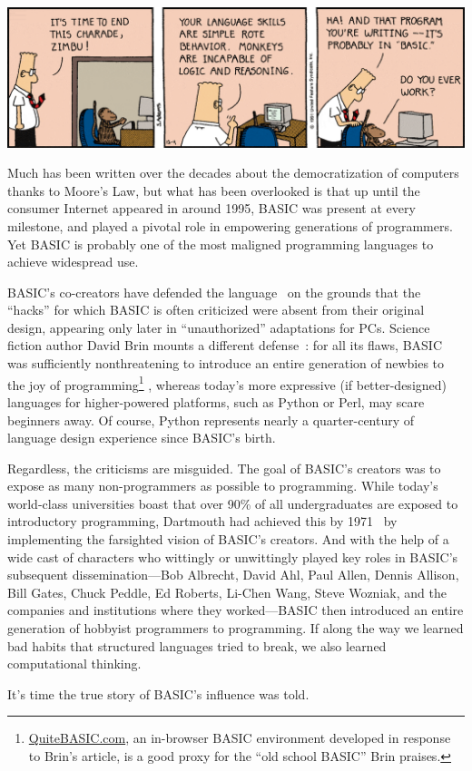 

\includegraphics[width=\textwidth]{figs/dilbert-1991-12-04.png}

Much has been written over the decades about the democratization of
computers thanks to Moore's Law, but what has been overlooked is that up
until the consumer Internet appeared in around 1995, BASIC was present
at every milestone, and played a pivotal role in empowering generations
of programmers.
Yet BASIC is probably one of the most maligned programming languages
to achieve widespread use.

BASIC's co-creators have defended the language~\cite{backtobasic} on the
grounds that the 
``hacks'' for which BASIC is often criticized were absent from 
 their original design, appearing only later in ``unauthorized''
 adaptations for PCs.
Science fiction author David Brin mounts a different
defense~\cite{why_johnny_cant_code}: 
for all its flaws, BASIC
was sufficiently nonthreatening to introduce an entire generation of
newbies to the joy of programming\footnote{\href{http://quitebasic.com}{QuiteBASIC.com}, an
in-browser BASIC environment developed in response to Brin's article, is
a good proxy for the ``old school BASIC'' Brin praises.}%
, whereas today's more expressive
(if better-designed) languages for higher-powered 
platforms, such as Python or Perl, may scare beginners away.
Of course, Python represents 
nearly a quarter-century of language design experience since BASIC's birth.

Regardless, the criticisms are misguided.
The goal of BASIC's creators was to expose as many non-programmers as
possible to programming.
While today's world-class universities boast that over 90\% of all
undergraduates are exposed to introductory programming, Dartmouth had
achieved this by 1971~\cite{man_and_computer} by implementing the
farsighted vision of BASIC's creators.
And with the help of a wide cast of characters who wittingly or
unwittingly played key roles in BASIC's subsequent dissemination---Bob
Albrecht, David Ahl, Paul Allen, Dennis Allison, Bill Gates, Chuck
Peddle, Ed Roberts, Li-Chen Wang, Steve Wozniak, and the companies and
institutions where they worked---BASIC then introduced an entire generation
of hobbyist programmers to programming.
If along the way we learned bad habits that structured languages tried to
break, we also learned computational thinking.

It's time the true story of BASIC's influence was told.
